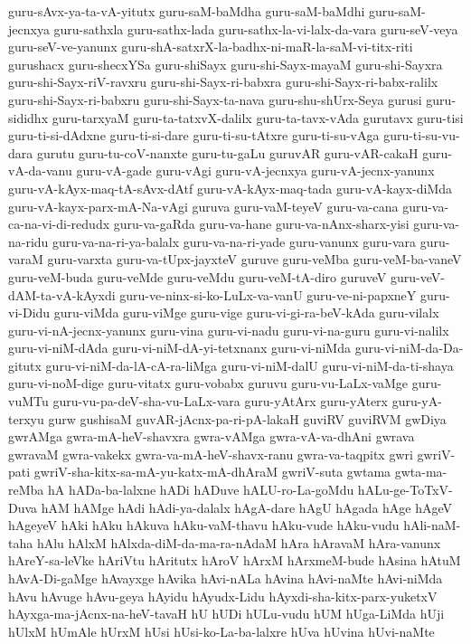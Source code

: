 {guru-sAvx-ya-ta-vA-yitutx
guru-saM-baMdha
guru-saM-baMdhi
guru-saM-jecnxya
guru-sathxla
guru-sathx-lada
guru-sathx-la-vi-lalx-da-vara
guru-seV-veya
guru-seV-ve-yanunx
guru-shA-satxrX-la-badhx-ni-maR-la-saM-vi-titx-riti
gurushacx
guru-shecxYSa
guru-shiSayx
guru-shi-Sayx-mayaM
guru-shi-Sayxra
guru-shi-Sayx-riV-ravxru
guru-shi-Sayx-ri-babxra
guru-shi-Sayx-ri-babx-ralilx
guru-shi-Sayx-ri-babxru
guru-shi-Sayx-ta-nava
guru-shu-shUrx-Seya
gurusi
guru-sididhx
guru-tarxyaM
guru-ta-tatxvX-dalilx
guru-ta-tavx-vAda
gurutavx
guru-tisi
guru-ti-si-dAdxne
guru-ti-si-dare
guru-ti-su-tAtxre
guru-ti-su-vAga
guru-ti-su-vu-dara
gurutu
guru-tu-coV-nanxte
guru-tu-gaLu
guruvAR
guru-vAR-cakaH
guru-vA-da-vanu
guru-vA-gade
guru-vAgi
guru-vA-jecnxya
guru-vA-jecnx-yanunx
guru-vA-kAyx-maq-tA-sAvx-dAtf
guru-vA-kAyx-maq-tada
guru-vA-kayx-diMda
guru-vA-kayx-parx-mA-Na-vAgi
guruva
guru-vaM-teyeV
guru-va-cana
guru-va-ca-na-vi-di-redudx
guru-va-gaRda
guru-va-hane
guru-va-nAnx-sharx-yisi
guru-va-na-ridu
guru-va-na-ri-ya-balalx
guru-va-na-ri-yade
guru-vanunx
guru-vara
guru-varaM
guru-varxta
guru-va-tUpx-jayxteV
guruve
guru-veMba
guru-veM-ba-vaneV
guru-veM-buda
guru-veMde
guru-veMdu
guru-veM-tA-diro
guruveV
guru-veV-dAM-ta-vA-kAyxdi
guru-ve-ninx-si-ko-LuLx-va-vanU
guru-ve-ni-papxneY
guru-vi-Didu
guru-viMda
guru-viMge
guru-vige
guru-vi-gi-ra-beV-kAda
guru-vilalx
guru-vi-nA-jecnx-yanunx
guru-vina
guru-vi-nadu
guru-vi-na-guru
guru-vi-nalilx
guru-vi-niM-dAda
guru-vi-niM-dA-yi-tetxnanx
guru-vi-niMda
guru-vi-niM-da-Da-gitutx
guru-vi-niM-da-lA-cA-ra-liMga
guru-vi-niM-dalU
guru-vi-niM-da-ti-shaya
guru-vi-noM-dige
guru-vitatx
guru-vobabx
guruvu
guru-vu-LaLx-vaMge
guru-vuMTu
guru-vu-pa-deV-sha-vu-LaLx-vara
guru-yAtArx
guru-yAterx
guru-yA-terxyu
gurw
gushisaM
guvAR-jAcnx-pa-ri-pA-lakaH
guviRV
guviRVM
gwDiya
gwrAMga
gwra-mA-heV-shavxra
gwra-vAMga
gwra-vA-va-dhAni
gwrava
gwravaM
gwra-vakekx
gwra-va-mA-heV-shavx-ranu
gwra-va-taqpitx
gwri
gwriV-pati
gwriV-sha-kitx-sa-mA-yu-katx-mA-dhAraM
gwriV-suta
gwtama
gwta-ma-reMba
hA
hADa-ba-lalxne
hADi
hADuve
hALU-ro-La-goMdu
hALu-ge-ToTxV-Duva
hAM
hAMge
hAdi
hAdi-ya-dalalx
hAgA-dare
hAgU
hAgada
hAge
hAgeV
hAgeyeV
hAki
hAku
hAkuva
hAku-vaM-thavu
hAku-vude
hAku-vudu
hAli-naM-taha
hAlu
hAlxM
hAlxda-diM-da-ma-ra-nAdaM
hAra
hAravaM
hAra-vanunx
hAreY-sa-leVke
hAriVtu
hAritutx
hAroV
hArxM
hArxmeM-bude
hAsina
hAtuM
hAvA-Di-gaMge
hAvayxge
hAvika
hAvi-nALa
hAvina
hAvi-naMte
hAvi-niMda
hAvu
hAvuge
hAvu-geya
hAyidu
hAyudx-Lidu
hAyxdi-sha-kitx-parx-yuketxV
hAyxga-ma-jAcnx-na-heV-tavaH
hU
hUDi
hULu-vudu
hUM
hUga-LiMda
hUji
hUlxM
hUmAle
hUrxM
hUsi
hUsi-ko-La-ba-lalxre
hUva
hUvina
hUvi-naMte
}
